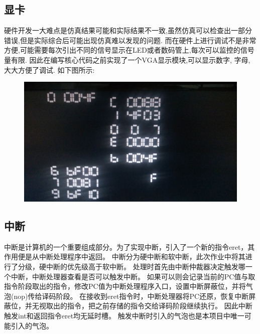 \subsection{显卡}
硬件开发一大难点是仿真结果可能和实际结果不一致,虽然仿真可以检查出一部分错误,但是实际综合后可能出现仿真难以发现的问题.
而在硬件上进行调试不是非常方便,可能需要每次引出不同的信号显示在LED或者数码管上,每次可以监控的信号量有限.
因此在编写核心代码之前实现了一个VGA显示模块,可以显示数字, 字母, 大大方便了调试. 如下图所示:
\begin{figure}[H]
  \centering
  \includegraphics[width=\textwidth]{figure/vga.jpg}
\end{figure}

\subsection{中断}
中断是计算机的一个重要组成部分。为了实现中断，引入了一个新的指令eret，其作用便是从中断处理程序中返回。
中断分为硬中断和软中断，此次作业中将其进行了分级，硬中断的优先级高于软中断。
处理时首先由中断仲裁器决定触发哪一个中断，中断处理器查看是否可以触发中断。
如果可以则会记录当前的PC值与取指令阶段取出的指令，修改PC值为中断处理程序入口，设置中断屏蔽位，并将气泡(nop)传给译码阶段。
在接收到eret指令时，中断处理器将PC还原，恢复中断屏蔽位，并无视取出的指令，把之前存储的指令交给译码阶段继续执行。
因此中断触发int和返回指令eret均无延时槽。
触发中断时引入的气泡也是本项目中唯一可能引入的气泡。

